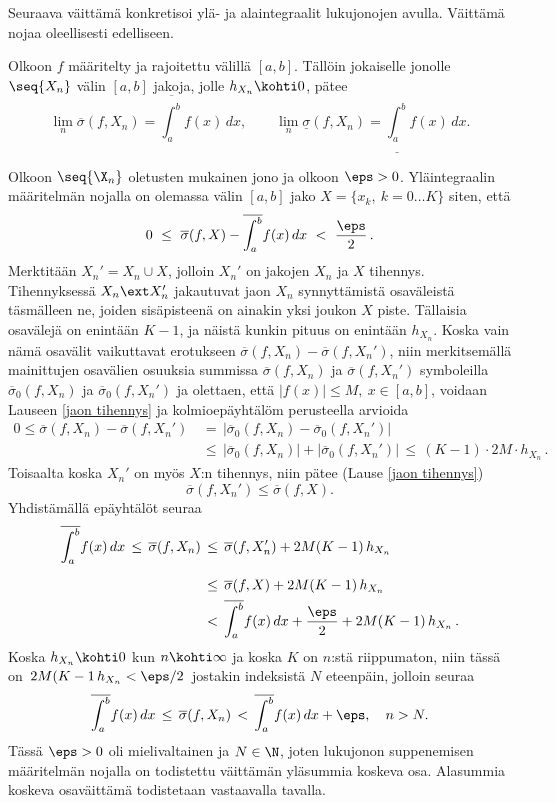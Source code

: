 Seuraava väittämä konkretisoi ylä- ja alaintegraalit lukujonojen avulla. Väittämä nojaa
oleellisesti edelliseen.  
\begin{*Lause} \label{ylä- ja alaintegraalit raja-arvoina} Olkoon $f$ määritelty ja rajoitettu
välillä $[a,b]$. Tällöin jokaiselle jonolle $\seq{X_n}$ välin $[a,b]$ jakoja, jolle
$h_{X_n} \kohti 0$, pätee
\[
\lim_n \overline{\sigma}(f,X_n)=\overline{\int_a^b} f(x)\,dx, \qquad
\lim_n \underline{\sigma}(f,X_n)=\underline{\int_a^b} f(x)\,dx.
\]
\end{*Lause}
\tod Olkoon $\seq{\X_n}$ oletusten mukainen jono ja olkoon $\eps>0$. Yläintegraalin määritelmän
nojalla on olemassa välin $[a,b]$ jako $X = \{x_k,\ k = 0 \ldots K\}$ siten, että
\[
0\ \le\ \overline{\sigma}(f,X)-\overline{\int_a^b} f(x)\,dx\ <\ \frac{\eps}{2}\,.
\]
Merktitään $X_n'=X_n \cup X$, jolloin $X_n'$ on jakojen $X_n$ ja $X$ tihennys. 
Tihennyksessä $X_n \ext X_n'$ jakautuvat jaon $X_n$ synnyttämistä osaväleistä täsmälleen ne,
joiden sisäpisteenä on ainakin yksi joukon $X$ piste. Tällaisia osavälejä on enintään $K-1$, 
ja näistä kunkin pituus on enintään $h_{X_n}$. Koska vain nämä osavälit vaikuttavat erotukseen
$\overline{\sigma}(f,X_n)-\overline{\sigma}(f,X_n')$, niin merkitsemällä mainittujen osavälien
osuuksia summissa $\overline{\sigma}(f,X_n)$ ja $\overline{\sigma}(f,X_n')$ symboleilla
$\overline{\sigma}_0(f,X_n)$ ja $\overline{\sigma}_0(f,X_n')$ ja olettaen, että
$|f(x)| \le M,\ x\in[a,b]$, voidaan Lauseen \ref{jaon tihennys} ja kolmioepäyhtälöm perusteella
arvioida
\begin{align*}
0\le\overline{\sigma}(f,X_n)-\overline{\sigma}(f,X_n')
 &\,=\,\left|\overline{\sigma}_0(f,X_n)-\overline{\sigma}_0(f,X_n')\right| \\ 
 &\,\le\,\left|\overline{\sigma}_0(f,X_n)\right|+\left|\overline{\sigma}_0(f,X_n')\right|
  \,\le\, (K-1) \cdot 2M \cdot h_{X_n}\,.
\end{align*}
Toisaalta koska $X_n'$ on myös $X$:n tihennys, niin pätee (Lause \ref{jaon tihennys})
\[
\overline{\sigma}(f,X_n')\le\overline{\sigma}(f,X).
\] 
Yhdistämällä epäyhtälöt seuraa
\begin{align*}
\overline{\int_a^b} f(x)\,dx\,
                \le\,\overline{\sigma}(f,X_n)\,
               &\le\,\overline{\sigma}(f,X_n')+2M(K-1)\,h_{X_n} \\[2mm]
               &\le\,\overline{\sigma}(f,X)+2M(K-1)\,h_{X_n} \\
               &<\,\overline{\int_a^b} f(x)\,dx +\frac{\eps}{2}+2M(K-1)\,h_{X_n}\,.
\end{align*}
Koska $h_{X_n} \kohti 0$ kun $n\kohti\infty$ ja koska $K$ on $n$:stä riippumaton, niin tässä 
on $\,2M(K-1\,h_{X_n}<\eps/2\,$ jostakin indeksistä $N$ eteenpäin, jolloin seuraa
\[
\overline{\int_a^b} f(x)\,dx\,\le\,\overline{\sigma}(f,X_n)\,
                                <\,\overline{\int_a^b} f(x)\,dx + \eps, \quad n>N.
\]
Tässä $\eps>0$ oli mielivaltainen ja $N\in\N$, joten lukujonon suppenemisen määritelmän nojalla
on todistettu väittämän yläsummia koskeva osa. Alasummia koskeva osaväittämä todistetaan 
vastaavalla tavalla. \loppu

